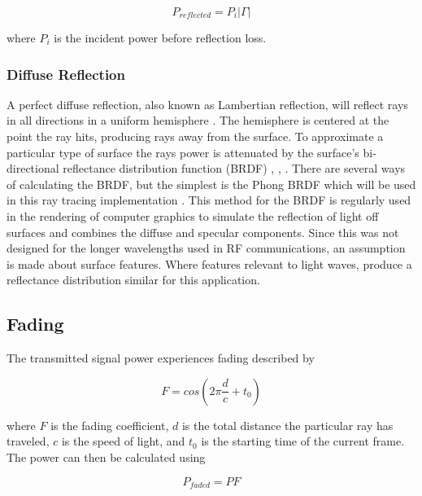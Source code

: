 \begin{equation}
	P_{reflected} = P_i|\Gamma|
	\label{eqn:reflected_power}
\end{equation}

where $P_i$ is the incident power before reflection loss.

\subsubsection{Diffuse Reflection}
A perfect diffuse reflection, also known as Lambertian reflection, will reflect rays in all directions in a uniform hemisphere \cite{Sizun2005}. The hemisphere is centered at the point the ray hits, producing rays away from the surface. To approximate a particular type of surface the rays power is attenuated by the surface's bi-directional reflectance distribution function (BRDF) \cite{Suffern2007}, \cite{Pharr2010}, \cite{Glassner1995}. There are several ways of calculating the BRDF, but the simplest is the Phong BRDF which will be used in this ray tracing implementation \cite{Phong:1998:ICG:280811.280980}. This method for the BRDF is regularly used in the rendering of computer graphics to simulate the reflection of light off surfaces and combines the diffuse and specular components. Since this was not designed for the longer wavelengths used in RF communications, an assumption is made about surface features. Where features relevant to light waves,  produce a reflectance distribution similar for this application. 


\subsection{Fading}
The transmitted signal power experiences fading described by

\begin{equation}
	F = cos\left(2\pi \frac{d}{c} + t_0\right)
	\label{eqn:fading_coeff}
\end{equation}

where $F$ is the fading coefficient, $d$ is the total distance the particular ray has traveled, $c$ is the speed of light, and $t_0$ is the starting time of the current frame. The power can then be calculated using

\begin{equation}
	P_{faded} = PF
	\label{eqn:power_faded}
\end{equation}

